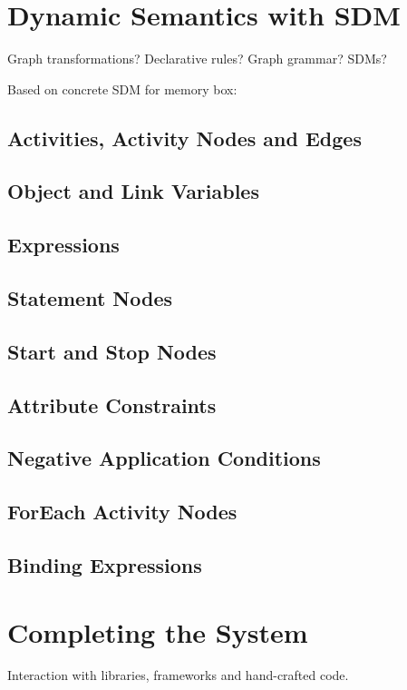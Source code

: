\section*{Dynamic Semantics with SDM}

Graph transformations?  Declarative rules?  Graph grammar?  SDMs?
 
Based on concrete SDM for memory box:

\subsection*{Activities, Activity Nodes and Edges}

\subsection*{Object and Link Variables}

\subsection*{Expressions}

\subsection*{Statement Nodes}

\subsection*{Start and Stop Nodes}

\subsection*{Attribute Constraints}

\subsection*{Negative Application Conditions}

\subsection*{ForEach Activity Nodes}

\subsection*{Binding Expressions}

\section{Completing the System}

Interaction with libraries, frameworks and hand-crafted code.